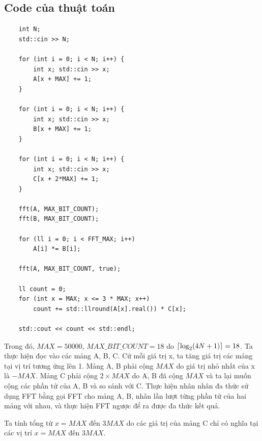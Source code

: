 \documentclass[../report.tex]{subfiles}
\begin{document}
\subsection{Code của thuật toán}
\begin{lstlisting}
    int N;
    std::cin >> N;

    for (int i = 0; i < N; i++) {
        int x; std::cin >> x;
        A[x + MAX] += 1;
    }

    for (int i = 0; i < N; i++) {
        int x; std::cin >> x;
        B[x + MAX] += 1;
    }

    for (int i = 0; i < N; i++) {
        int x; std::cin >> x;
        C[x + 2*MAX] += 1;
    }

    fft(A, MAX_BIT_COUNT);
    fft(B, MAX_BIT_COUNT);

    for (ll i = 0; i < FFT_MAX; i++)
        A[i] *= B[i];

    fft(A, MAX_BIT_COUNT, true);

    ll count = 0;
    for (int x = MAX; x <= 3 * MAX; x++)
        count += std::llround(A[x].real()) * C[x];

    std::cout << count << std::endl;
\end{lstlisting}
Trong đó, $MAX = 50000$, $MAX\_BIT\_COUNT = 18$ 
do $\lceil\log_2 (4N + 1)\rceil = 18$.
Ta thực hiện đọc vào các mảng A, B, C. 
Cứ mỗi giá trị x, ta tăng giá trị 
các mảng tại vị trí tương ứng lên 1. 
Mảng A, B phải cộng $MAX$ do giá trị nhỏ nhất của x là $-MAX$. 
Mảng C phải cộng $2 \times MAX$ do A, B đã cộng $MAX$ và ta lại muốn 
cộng các phần tử của A, B và so sánh với C. 
Thực hiện nhân nhân đa thức sử dụng FFT bằng gọi FFT cho mảng A, B,
nhân lần lượt từng phần tử của hai mảng với nhau, và thực hiện 
FFT ngược để ra được đa thức kết quả.

Ta tính tổng từ $x = MAX$ đến $3 MAX$ do các giá trị của mảng 
C chỉ có nghĩa tại các vị trí $x = MAX$ đến $3 MAX$.
\end{document}
